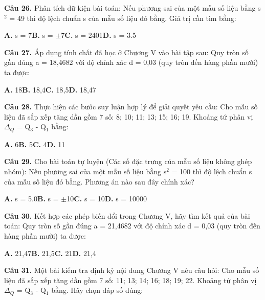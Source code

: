 \documentclass[11pt,a4paper]{article}
\begin{document}
\textbf{\color{primary} Câu 26.} Phân tích dữ kiện bài toán: Nếu phương sai của một mẫu số liệu bằng s$^2$ = 49 thì độ lệch chuẩn s của mẫu số liệu đó bằng. Giá trị cần tìm bằng:\par
\hspace*{1.5em}\textbf{A.} s = 7\quad\quad \textbf{B.} s = $\pm$7\quad\quad \textbf{C.} s = 2401\quad\quad \textbf{D.} s = 3.5\par\vspace{2pt}
\textbf{\color{primary} Câu 27.} Áp dụng tính chất đã học ở Chương V vào bài tập sau: Quy tròn số gần đúng a = 18,4682 với độ chính xác d = 0,03 (quy tròn đến hàng phần mười) ta được:\par
\hspace*{1.5em}\textbf{A.} 18\quad\quad \textbf{B.} 18,4\quad\quad \textbf{C.} 18,5\quad\quad \textbf{D.} 18,47\par\vspace{2pt}
\textbf{\color{primary} Câu 28.} Thực hiện các bước suy luận hợp lý để giải quyết yêu cầu: Cho mẫu số liệu đã sắp xếp tăng dần gồm 7 số: 8; 10; 11; 13; 15; 16; 19. Khoảng tứ phân vị $\Delta_Q$ = Q$_3$ - Q$_1$ bằng:\par
\hspace*{1.5em}\textbf{A.} 6\quad\quad \textbf{B.} 5\quad\quad \textbf{C.} 4\quad\quad \textbf{D.} 11\par\vspace{2pt}
\textbf{\color{primary} Câu 29.} Cho bài toán tự luyện (Các số đặc trưng của mẫu số liệu không ghép nhóm): Nếu phương sai của một mẫu số liệu bằng s$^2$ = 100 thì độ lệch chuẩn s của mẫu số liệu đó bằng. Phương án nào sau đây chính xác?\par
\hspace*{1.5em}\textbf{A.} s = 5.0\quad\quad \textbf{B.} s = $\pm$10\quad\quad \textbf{C.} s = 10\quad\quad \textbf{D.} s = 10000\par\vspace{2pt}
\textbf{\color{primary} Câu 30.} Kết hợp các phép biến đổi trong Chương V, hãy tìm kết quả của bài toán: Quy tròn số gần đúng a = 21,4682 với độ chính xác d = 0,03 (quy tròn đến hàng phần mười) ta được:\par
\hspace*{1.5em}\textbf{A.} 21,47\quad\quad \textbf{B.} 21,5\quad\quad \textbf{C.} 21\quad\quad \textbf{D.} 21,4\par\vspace{2pt}
\textbf{\color{primary} Câu 31.} Một bài kiểm tra định kỳ nội dung Chương V nêu câu hỏi: Cho mẫu số liệu đã sắp xếp tăng dần gồm 7 số: 11; 13; 14; 16; 18; 19; 22. Khoảng tứ phân vị $\Delta_Q$ = Q$_3$ - Q$_1$ bằng. Hãy chọn đáp số đúng:\par
\end{document}
